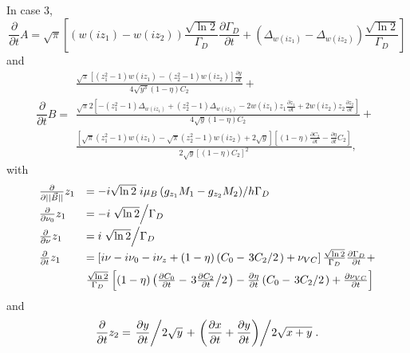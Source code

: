 In case 3,
\begin{equation}
  \frac{\partial}{\partial t} A = \sqrt{\pi} \left[ \left(w(iz_1) - w(iz_2)\right) \frac{\sqrt{\ln 2}}{\Gamma_D}\frac{\partial \Gamma_D}{\partial t} + \left(\Delta_{w(iz_1)} - \Delta_{w(iz_2)}\right) \frac{\sqrt{\ln 2}}{\Gamma_D}\right]
\end{equation}
and
\begin{equation}
 \frac{\partial}{\partial t} B =
 \begin{array}{l}
 \frac{\sqrt{\pi}\left[\left(z_1^2 - 1\right) w(iz_1) - \left(z_2^2 - 1\right)w(iz_2)\right] \frac{\partial y}{\partial t}}{4 \sqrt{y^3} (1-\eta)C_2} + \\[5pt]
  \frac{\sqrt{\pi}
                       2 \left[-\left(z_1^2 - 1\right) \Delta_{w(iz_1)} + \left(z_2^2 - 1\right) \Delta_{w(iz_2)} -
                            2 w(iz_1) z_1 \frac{\partial z_1}{\partial t} + 2 w(iz_2) z_2 \frac{\partial z_2}{\partial t}\right]}{4 \sqrt{y} (1-\eta)C_2} + \\[5pt]
  \frac{\left[\sqrt{\pi} \left(z_1^2 - 1\right) w(iz_1) -
                       \sqrt{\pi} \left(z^2_2 - 1\right) w(iz_2) + 2 \sqrt{y}\right]
                      \left[(1-\eta)\frac{\partial C_2}{\partial t} - \frac{\partial \eta}{\partial t}C_2\right] }
                 {2 \sqrt{y} \left[(1-\eta)C_2\right]^2},
 \end{array}
\end{equation}
with
\begin{equation}
 \begin{array}{ll}
  \frac{\partial}{\partial ||\vec{B}||}z_1 &= -i \sqrt{\ln 2} \left.i\mu_B\left(g_{z_1}M_1 - g_{z_2}M_2\right)\middle/h\Gamma_D\right.  \\[5pt]
  \frac{\partial}{\partial \nu_0} z_1 &= -i\left.\sqrt{\ln2}\middle/\Gamma_D\right. \\[5pt]
  \frac{\partial}{\partial \nu} z_1 &= i\left.\sqrt{\ln 2}\middle/\Gamma_D\right. \\[5pt]
  \frac{\partial}{\partial t} z_1 &= \left[i\nu - i\nu_0 - i\nu_z + (1-\eta)\left(C_0 - \left.3C_2\middle/2\right.\right) + \nu_{VC}\right] \frac{\sqrt{\ln 2}}{\Gamma_D}\frac{\partial \Gamma_D}{\partial t} + \\[5pt]&
 \frac{\sqrt{\ln 2}}{\Gamma_D} \left[(1-\eta)\left(\frac{\partial C_0}{\partial t} - \left.3\frac{\partial C_2}{\partial t}\middle/2\right.\right)-\frac{\partial\eta}{\partial t}\left(C_0 - \left.3C_2\middle/2\right.\right) + \frac{\partial\nu_{VC}}{\partial t}\right]
 \end{array}
\end{equation}
and
\begin{equation}
\frac{\partial}{\partial t} z_2 = \left.\frac{\partial y}{\partial t} \middle/ 2\sqrt{y}\right. + \left.\left(\frac{\partial x}{\partial t} + \frac{\partial y}{\partial t}\right) \middle/ 2 \sqrt{x+y} \right..
\end{equation}


